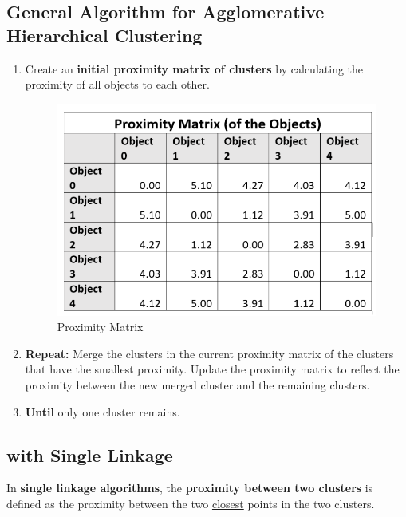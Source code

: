 \documentclass[11pt]{elegantbook}
\begin{document}
\subsection{General Algorithm for Agglomerative Hierarchical Clustering}
\begin{enumerate}[1.]
    \item Create an \textbf{initial proximity matrix of clusters} by calculating the proximity of all objects to each other.
    \begin{center}\begin{figure}[htbp]
        \centering
        \includegraphics[scale=0.25]{PM.png}
        \caption{Proximity Matrix}
        \label{}
    \end{figure}\end{center}
    \item \textbf{Repeat:}
    \subitem Merge the clusters in the current proximity matrix of the clusters that have the smallest proximity.
    \subitem Update the proximity matrix to reflect the proximity between the new merged cluster and the remaining clusters.
    \item \textbf{Until} only one cluster remains.
\end{enumerate}

\subsection{ with Single Linkage}

In \textbf{single linkage algorithms}, the \textbf{proximity between two clusters} is defined as the proximity between the two \underline{closest} points in the two clusters.
\end{document}
